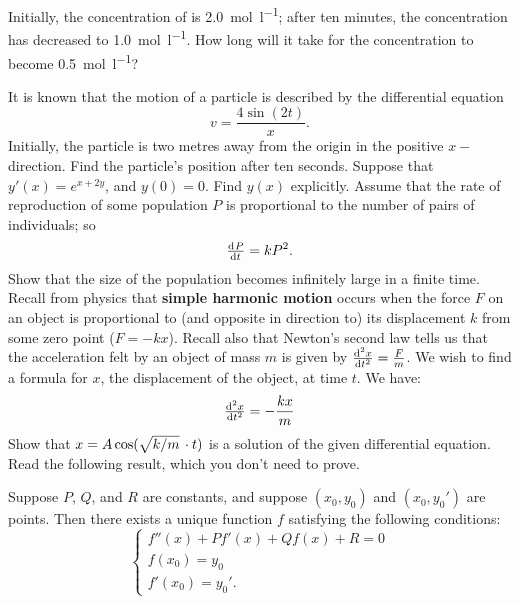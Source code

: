 \begin{questions}
\begin{parts}
            Initially, the concentration of  is \SI{2.0}{\mole\per\litre}; after ten minutes, the concentration has decreased to \SI{1.0}{\mole\per\litre}. How
            long will it take for the concentration to become \SI{0.5}{\mole\per\litre}?
    \end{parts}
  \questioM It is known that the motion of a particle is described by the differential equation
            \begin{displaymath}
              v = \frac{4\sin(2t)}{x}.
            \end{displaymath}
            Initially, the particle is two metres away from the origin in the positive $x-$direction.
            Find the particle's position after ten seconds.
  \questioM Suppose that $ y'(x) = e^{x + 2y} $, and $ y(0) = 0 $. Find $ y(x) $ explicitly.
  \questioM Assume that the rate of reproduction of some population $ P $ is proportional to the number of pairs of individuals; so
            \begin{displaymath}
              \od{P}{t} = kP^2.
            \end{displaymath}
            Show that the size of the population becomes infinitely large in a finite time.
  \questioM Recall from physics that \textbf{simple harmonic motion} occurs when the force $ F $ on an object is proportional to (and opposite
            in direction to) its displacement $ k $ from some zero point ($ F = -kx $). Recall also that Newton's second law tells us that the
            acceleration felt by an object of mass $ m $ is given by $ \od[2]{x}{t} = \frac{F}{m} $. We wish to find a formula for $ x $, the
            displacement of the object, at time $ t $. We have:
            \begin{displaymath}
              \od[2]{x}{t} = -\frac{kx}{m}
            \end{displaymath}
            Show that $ x = A \cos(\sqrt{k/m} \thinspace\cdot t) $ is a solution of the given differential equation.
  \questioE Read the following result, which you don't need to prove.
            \begin{thm}
              Suppose $ P $, $ Q $, and $ R $ are constants, and suppose $ (x_0, y_0) $  and $ (x_0, y_0') $ are points. Then
              there exists a unique function $ f $ satisfying the following conditions:
              \begin{displaymath}
                \begin{cases}
                  f''(x) + Pf'(x) + Qf(x) + R = 0\\
                  f(x_0) = y_0\\
                  f'(x_0) = y_0'.
                \end{cases}
              \end{displaymath}
            \end{thm}
            \begin{parts}

\end{parts}
\end{questions}
